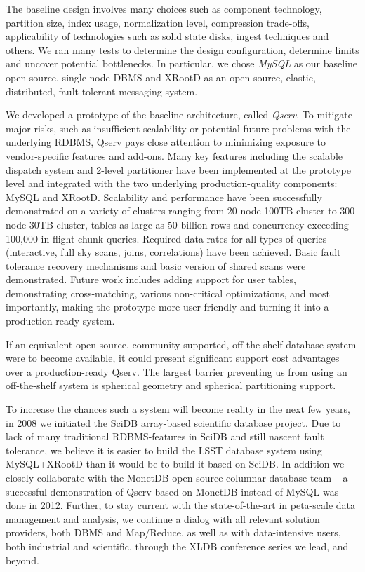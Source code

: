 \documentclass[DM,lsstdraft,toc]{lsstdoc}
\begin{document}
The baseline design involves many choices such as component technology,
partition size, index usage, normalization level, compression
trade-offs, applicability of technologies such as solid state disks,
ingest techniques and others. We ran many tests to determine the design
configuration, determine limits and uncover potential bottlenecks. In
particular, we chose \emph{MySQL} as our baseline open source,
single-node DBMS and XRootD \citep{XRootD} as an open source,
elastic, distributed, fault-tolerant messaging system.

We developed a prototype of the baseline architecture, called
\emph{Qserv}. To mitigate major risks, such as insufficient scalability
or potential future problems with the underlying RDBMS, Qserv pays close
attention to minimizing exposure to vendor-specific features and
add-ons. Many key features including the scalable dispatch system and
2-level partitioner have been implemented at the prototype level and
integrated with the two underlying production-quality components: MySQL
and XRootD. Scalability and performance have
been successfully demonstrated on a variety of clusters ranging from
20-node-100TB cluster to 300-node-30TB cluster, tables as large as 50
billion rows and concurrency exceeding 100,000 in-flight chunk-queries.
Required data rates for all types of queries (interactive, full sky
scans, joins, correlations) have been achieved. Basic fault tolerance
recovery mechanisms and basic version of shared scans were demonstrated.
Future work includes adding support for user tables, demonstrating
cross-matching, various non-critical optimizations, and most
importantly, making the prototype more user-friendly and turning it into
a production-ready system.

If an equivalent open-source, community supported, off-the-shelf
database system were to become available, it could present significant
support cost advantages over a production-ready Qserv. The largest
barrier preventing us from using an off-the-shelf system is spherical
geometry and spherical partitioning support.

To increase the chances such a system will become reality in the next
few years, in 2008 we initiated the SciDB array-based scientific
database project. Due to lack of many traditional RDBMS-features in
SciDB and still nascent fault tolerance, we believe it is easier to
build the LSST database system using
MySQL+XRootD than it would be to build it
based on SciDB. In addition we closely collaborate with the MonetDB open
source columnar database team -- a successful demonstration of Qserv
based on MonetDB instead of MySQL was done in 2012. Further, to stay
current with the state-of-the-art in peta-scale data management and
analysis, we continue a dialog with all relevant solution providers,
both DBMS and Map/Reduce, as well as with data-intensive users, both
industrial and scientific, through the XLDB \citep{XLDB}
conference series we lead, and beyond.
\end{document}
